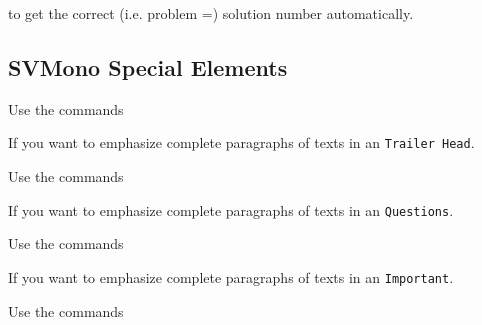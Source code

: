 \documentclass[graybox,square]{svmono}
\begin{document}
\begin{sloppy}
to get the correct (i.e. problem =) solution number automatically.


\subsection{SVMono Special Elements}

Use the commands

\cprotect{}

If you want to emphasize complete paragraphs of texts in an \verb|Trailer Head|.  


Use the commands

\cprotect{}

If you want to emphasize complete paragraphs of texts in an \verb|Questions|.  

\eject

Use the commands

\cprotect{}

If you want to emphasize complete paragraphs of texts in an \verb|Important|.  

Use the commands

\cprotect{}


\end{sloppy}
\end{document}
